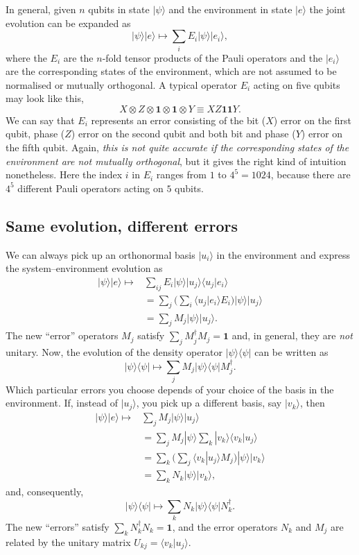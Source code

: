 \documentclass[fleqn]{article}
\begin{document}
In general, given \(n\) qubits in state \(|\psi\rangle\) and the environment in state \(|e\rangle\) the joint evolution can be expanded as
\[
|\psi\rangle|e\rangle \longmapsto \sum_i E_i|\psi\rangle|e_i\rangle,
\]
where the \(E_i\) are the \(n\)-fold tensor products of the Pauli operators and the \(|e_i\rangle\) are the corresponding states of the environment, which are not assumed to be normalised or mutually orthogonal.
A typical operator \(E_i\) acting on five qubits may look like this,
\[
  X\otimes Z \otimes \mathbf{1}\otimes \mathbf{1}\otimes Y
  \equiv XZ\mathbf{1}\mathbf{1}Y.
\]
We can say that \(E_i\) represents an error consisting of the bit (\(X\)) error on the first qubit, phase (\(Z\)) error on the second qubit and both bit and phase (\(Y\)) error on the fifth qubit.
Again, \emph{this is not quite accurate if the corresponding states of the environment are not mutually orthogonal}, but it gives the right kind of intuition nonetheless.
Here the index \(i\) in \(E_i\) ranges from \(1\) to \(4^5=1024\), because there are \(4^5\) different Pauli operators acting on \(5\) qubits.

\hypertarget{same-evolution-different-errors}{%
\subsection{Same evolution, different errors}\label{same-evolution-different-errors}}

We can always pick up an orthonormal basis \(|u_i\rangle\) in the environment and express the system--environment evolution as
\[
  \begin{aligned}
    |\psi\rangle|e\rangle
    \longmapsto &\sum_{ij} E_i|\psi\rangle|u_j\rangle\langle u_j|e_i\rangle
    \\&= \sum_{j}\Big( \sum_i \langle u_j|e_i\rangle E_i\Big)|\psi\rangle|u_j\rangle
    \\&= \sum_j M_j|\psi\rangle|u_j\rangle.
  \end{aligned}
\]
The new ``error'' operators \(M_j\) satisfy \(\sum_j M_j^\dagger M_j =\mathbf{1}\) and, in general, they are \emph{not} unitary.
Now, the evolution of the density operator \(|\psi\rangle\langle\psi|\) can be written as
\[
  |\psi\rangle\langle\psi|\longmapsto \sum_j M_j|\psi\rangle\langle\psi| M_j^\dagger.
\]
Which particular errors you choose depends of your choice of the basis in the environment.
If, instead of \(|u_j\rangle\), you pick up a different basis, say \(|v_k\rangle\), then
\[
  \begin{aligned}
    |\psi\rangle|e\rangle
    \longmapsto &\sum_j M_j|\psi\rangle|u_j\rangle
  \\&= \sum_j M_j |\psi\rangle\sum_k|v_k\rangle\langle v_k|u_j\rangle
  \\&= \sum_k \Big(\sum_j \langle v_k|u_j\rangle M_j \Big)|\psi\rangle|v_k\rangle
  \\&= \sum_k N_k|\psi\rangle|v_k\rangle,
  \end{aligned}
\]
and, consequently,
\[
  |\psi\rangle\langle\psi|\longmapsto \sum_k N_k|\psi\rangle\langle\psi| N_k^\dagger.
\]
The new ``errors'' satisfy \(\sum_k N_k^\dagger N_k = \mathbf{1}\), and the error operators \(N_k\) and \(M_j\) are related by the unitary matrix \(U_{kj}=\langle v_k|u_j\rangle\).
\end{document}
